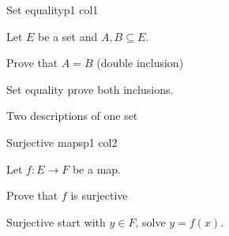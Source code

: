 \documentclass[sheet]{neyvia-study}
\begin{document}
\maketitle


\begin{concept}{Set equality}{p1 col1}
\begin{definition}
Let $E$ be a set and $A,B\subseteq E$.
\end{definition}
\begin{method}{Prove that $A=B$ (double inclusion)}
\end{method}
\begin{reflex}
Set equality \ra{} prove both inclusions.
\end{reflex}
\begin{worked}{Two descriptions of one set}
\end{worked}
\begin{traps}
\end{traps}
\begin{practice}
\end{practice}
\end{concept}

\begin{concept}{Surjective maps}{p1 col2}
\begin{definition}
Let $f:E\to F$ be a map.
\end{definition}
\begin{method}{Prove that $f$ is surjective}
\end{method}
\begin{reflex}
Surjective \ra{} start with $y\in F$, solve $y=f(x)$.
\end{reflex}
\end{concept}
\end{document}
